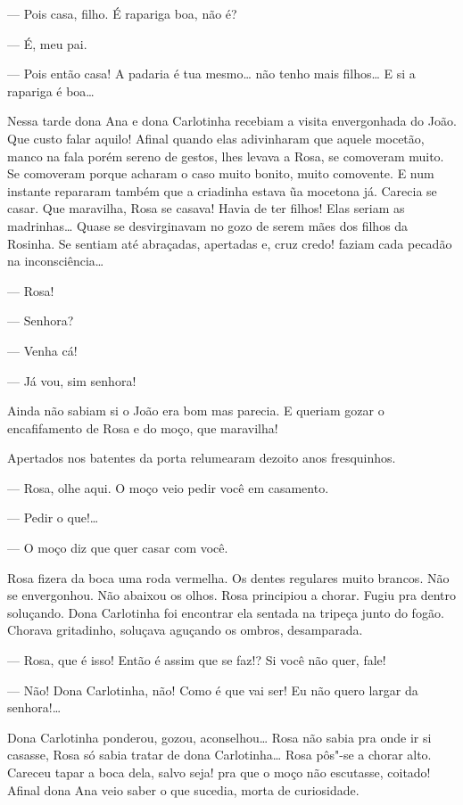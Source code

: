 --- Pois casa, filho. É rapariga boa, não é?

--- É, meu pai. 

--- Pois então casa! A padaria é tua mesmo\ldots{} não tenho mais filhos\ldots{} E
si a rapariga é boa\ldots{}

Nessa tarde dona Ana e dona Carlotinha recebiam a visita envergonhada do
João. Que custo falar aquilo! Afinal quando elas adivinharam que aquele
mocetão, manco na fala porém sereno de gestos, lhes levava a Rosa, se
comoveram muito. Se comoveram porque acharam o caso muito bonito, muito
comovente. E num instante repararam também que a criadinha estava ũa
mocetona já. Carecia se casar. Que maravilha, Rosa se casava! Havia de
ter filhos! Elas seriam as madrinhas\ldots{} Quase se desvirginavam no gozo
de serem mães dos filhos da Rosinha. Se sentiam até abraçadas, apertadas
e, cruz credo! faziam cada pecadão na inconsciência\ldots{}

--- Rosa!

--- Senhora?

--- Venha cá!

--- Já vou, sim senhora!

Ainda não sabiam si o João era bom mas parecia. E queriam gozar o
encafifamento de Rosa e do moço, que maravilha!

Apertados nos batentes da porta relumearam dezoito anos fresquinhos.

--- Rosa, olhe aqui. O moço veio pedir você em casamento.

--- Pedir o que!\ldots{}

--- O moço diz que quer casar com você.

Rosa fizera da boca uma roda vermelha. Os dentes regulares muito
brancos. Não se envergonhou. Não abaixou os olhos. Rosa principiou a
chorar. Fugiu pra dentro soluçando. Dona Carlotinha foi encontrar ela
sentada na tripeça junto do fogão. Chorava gritadinho, soluçava aguçando
os ombros, desamparada.

--- Rosa, que é isso! Então é assim que se faz!? Si você não quer, fale!

--- Não! Dona Carlotinha, não! Como é que vai ser! Eu não quero largar
da senhora!\ldots{} 

Dona Carlotinha ponderou, gozou, aconselhou\ldots{} Rosa não sabia pra onde
ir si casasse, Rosa só sabia tratar de dona Carlotinha\ldots{} Rosa pôs"-se a
chorar alto. Careceu tapar a boca dela, salvo seja! pra que o moço não
escutasse, coitado! Afinal dona Ana veio saber o que sucedia, morta de
curiosidade.

